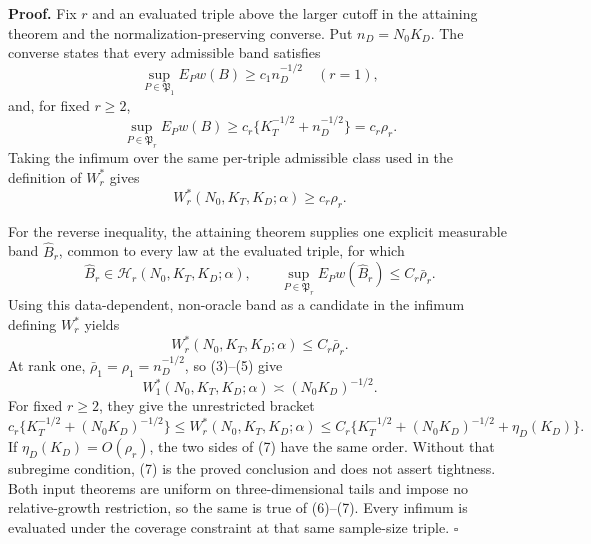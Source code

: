 \textbf{Proof.}
Fix \(r\) and an evaluated triple above the larger cutoff in the attaining
theorem and the normalization-preserving converse.  Put \(n_D=N_0K_D\).
The converse states that every admissible band satisfies
\[
 \sup_{P\in\mathfrak P_1}E_Pw(B)\ge c_1n_D^{-1/2}
 \quad(r=1),                                                \tag{1}
\]
and, for fixed \(r\ge2\),
\[
 \sup_{P\in\mathfrak P_r}E_Pw(B)
 \ge c_r\{K_T^{-1/2}+n_D^{-1/2}\}=c_r\rho_r.             \tag{2}
\]
Taking the infimum over the same per-triple admissible class used in the
definition of \(W_r^*\) gives
\[
 W_r^*(N_0,K_T,K_D;\alpha)\ge c_r\rho_r.                  \tag{3}
\]

For the reverse inequality, the attaining theorem supplies one explicit
measurable band \(\widehat B_r\), common to every law at the evaluated
triple, for which
\[
 \widehat B_r\in\mathcal H_r(N_0,K_T,K_D;\alpha),
 \qquad
 \sup_{P\in\mathfrak P_r}E_Pw(\widehat B_r)\le C_r\bar\rho_r. \tag{4}
\]
Using this data-dependent, non-oracle band as a candidate in the infimum
defining \(W_r^*\) yields
\[
 W_r^*(N_0,K_T,K_D;\alpha)\le C_r\bar\rho_r.              \tag{5}
\]
At rank one, \(\bar\rho_1=\rho_1=n_D^{-1/2}\), so (3)--(5) give
\[
 W_1^*(N_0,K_T,K_D;\alpha)\asymp(N_0K_D)^{-1/2}.          \tag{6}
\]
For fixed \(r\ge2\), they give the unrestricted bracket
\[
 c_r\{K_T^{-1/2}+(N_0K_D)^{-1/2}\}
 \le W_r^*(N_0,K_T,K_D;\alpha)
 \le C_r\{K_T^{-1/2}+(N_0K_D)^{-1/2}+\eta_D(K_D)\}.       \tag{7}
\]
If \(\eta_D(K_D)=O(\rho_r)\), the two sides of (7) have the same order.
Without that subregime condition, (7) is the proved conclusion and does not
assert tightness.  Both input theorems are uniform on three-dimensional
tails and impose no relative-growth restriction, so the same is true of
(6)--(7).  Every infimum is evaluated under the coverage constraint at that
same sample-size triple. \(\square\)